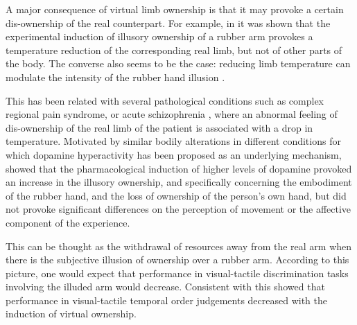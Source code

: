 \documentclass[
		twoside,openright,titlepage,numbers=noenddot,manychapters,
		headinclude,%
                footinclude=false,cleardoublepage=empty,
                BCOR=5mm,
		fontsize=11pt, %
                 enabledeprecatedfontcommands]{scrreprt}
\begin{document}
A major consequence of virtual limb ownership is that it may provoke a certain dis-ownership of the real counterpart. For example, in \cite{Moseley2008a} it was shown that the experimental induction of illusory ownership of a rubber arm \cite[]{Botvinick1998} provokes a temperature reduction of the corresponding real limb, but not of other parts of the body. The converse also seems to be the case: reducing limb temperature can modulate the intensity of the rubber hand illusion \cite[]{Kammers2011}.

This has been related with several pathological conditions such as complex regional pain syndrome, or acute schizophrenia \cite[]{Moseley2008a}, where an abnormal feeling of dis-ownership of the real limb of the patient is associated with a drop in temperature. Motivated by similar bodily alterations in different conditions for which dopamine hyperactivity has been proposed as an underlying mechanism, \cite{Albrecht2011} showed that the pharmacological induction of higher levels of dopamine provoked an increase in the illusory ownership, and specifically concerning the embodiment of the rubber hand, and the loss of ownership of the person’s own hand, but did not provoke significant differences on the perception of movement or the affective component of the experience.

This can be thought as the withdrawal of resources away from the real arm when there is the subjective illusion of ownership over a rubber arm. According to this picture, one would expect that performance in visual-tactile discrimination tasks involving the illuded arm would decrease. Consistent with this \cite{Moseley2008a} showed that performance in visual-tactile temporal order judgements decreased with the induction of virtual ownership.
\end{document}
